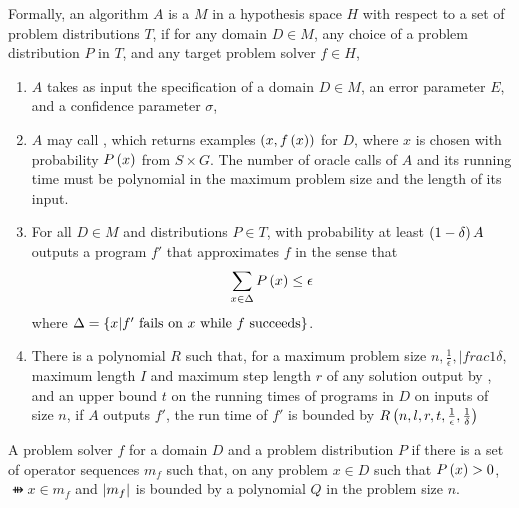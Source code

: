 \begin{defi}%
Formally, an algorithm $A$ is a  $M$ in a hypothesis space $H$ with respect to a set of problem distributions $T$, if for any domain $D\in M$, any choice of a problem distribution $P$ in $T$, and any target problem solver $f\in H$,
\begin{enumerate}
\item $A$ takes as input the specification of a domain $D\in M$, an error parameter $E$, and a confidence parameter $\sigma$,
\item $A$ may call , which returns examples $\left( x,f\left(x\right)\right)$ for $D$, where $x$ is chosen with probability $P\left(x\right)$ from $S\times G$. The number of oracle calls of $A$ and its running time must be polynomial in the maximum problem size and the length of its input.
\item For all $D\in M$ and distributions $P\in T$, with probability at least $\left( 1-\delta\right)A$ outputs a program $f'$ that approximates $f$ in the sense that
\begin{equation}
\displaystyle\sum_{x\in\Delta}{P\left(x\right)}\leq\epsilon
\end{equation}
where $\Delta=\left\{ x | f'\mbox{ fails on }x\mbox{ while }f\mbox{ succeeds}\right\}$.
\item There is a polynomial $R$ such that, for a maximum problem size $n,\frac{1}{\epsilon},|frac{1}{\delta}$, maximum length $I$ and maximum step length $r$ of any solution output by , and an upper bound $t$ on the running times of programs in $D$ on inputs of size $n$, if $A$ outputs $f'$, the run time of $f'$ is bounded by $R\left(n,l,r,t,\frac{1}{\epsilon},\frac{1}{\delta}\right)$
\end{enumerate}
\cite{conf/ijcai/Tadepalli91}
\end{defi}

\begin{defi}
A problem solver $f$ for a domain $D$ and a problem distribution $P$  if there is a set of operator sequences $m_f$ such that, on any problem $x\in D$ such that $P\left(x\right)>0$, $\ffun{x}\in m_f$ and $\left|m_f\right|$ is bounded by a polynomial $Q$ in the problem size $n$.
\cite{conf/ijcai/Tadepalli91}
\end{defi}

